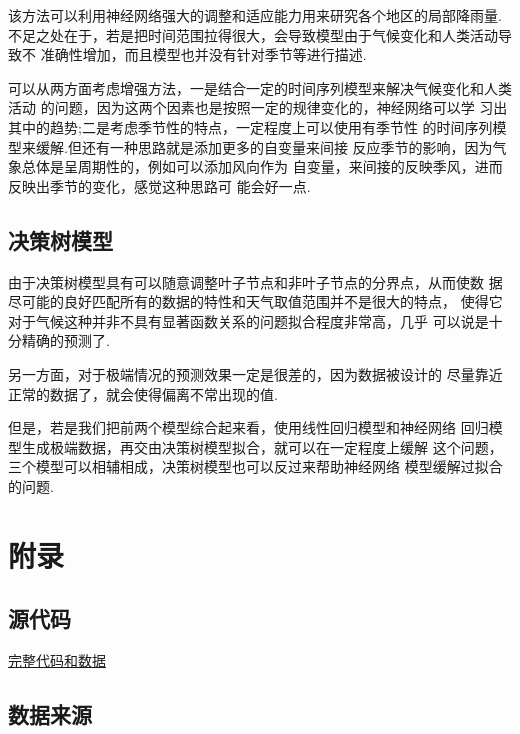 \documentclass[UTF8, a4paper]{ctexart}
\begin{document}
该方法可以利用神经网络强大的调整和适应能力用来研究各个地区的局部降雨量.
不足之处在于，若是把时间范围拉得很大，会导致模型由于气候变化和人类活动导致不
准确性增加，而且模型也并没有针对季节等进行描述.

可以从两方面考虑增强方法，一是结合一定的时间序列模型来解决气候变化和人类活动
的问题，因为这两个因素也是按照一定的规律变化的，神经网络可以学
习出其中的趋势;二是考虑季节性的特点，一定程度上可以使用有季节性
的时间序列模型来缓解.但还有一种思路就是添加更多的自变量来间接
反应季节的影响，因为气象总体是呈周期性的，例如可以添加风向作为
自变量，来间接的反映季风，进而反映出季节的变化，感觉这种思路可
能会好一点.

\subsection{决策树模型}
由于决策树模型具有可以随意调整叶子节点和非叶子节点的分界点，从而使数
据尽可能的良好匹配所有的数据的特性和天气取值范围并不是很大的特点，
使得它对于气候这种并非不具有显著函数关系的问题拟合程度非常高，几乎
可以说是十分精确的预测了.

另一方面，对于极端情况的预测效果一定是很差的，因为数据被设计的
尽量靠近正常的数据了，就会使得偏离不常出现的值.

但是，若是我们把前两个模型综合起来看，使用线性回归模型和神经网络
回归模型生成极端数据，再交由决策树模型拟合，就可以在一定程度上缓解
这个问题，三个模型可以相辅相成，决策树模型也可以反过来帮助神经网络
模型缓解过拟合的问题.


\appendix
\setcounter{secnumdepth}{-2}
\section{附录}

\setcounter{secnumdepth}{3}
\subsection{源代码}

\href{https://github.com/limuy2022/math_model}{完整代码和数据}

\subsection{数据来源}\label{data}
\end{document}
